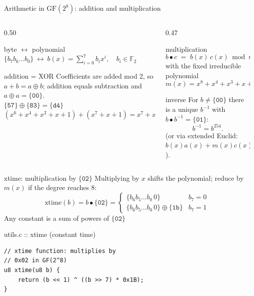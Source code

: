 \documentclass[aspectratio=169,10pt]{beamer}
\newcommand{\xor}{\oplus}
\newcommand{\gm}{\bullet}                       %
\newcommand{\GF}{\mathrm{GF}(2^8)}
\newcommand{\fn}[1]{\mathrm{#1}}
\newcommand{\hx}[1]{\ensuremath{\mathtt{\{#1\}}}}            %
\begin{document}
\begin{frame}{Arithmetic in $\GF$: addition and multiplication}
\begin{columns}[T]
\begin{column}{0.50\textwidth}
\begin{tbox}{byte $\leftrightarrow$ polynomial}
\small
$\{b_7b_6\dots b_0\}\ \leftrightarrow\ b(x)=\sum_{i=0}^{7}b_i x^i,\quad b_i\in\mathbb{F}_2$
\end{tbox}
\vskip6pt
\begin{tbox}{addition = XOR}
\small
Coefficients are added mod 2, so $a+b=a\xor b$; addition equals subtraction and $a\xor a=\hx{00}$.\\[3pt]
$\hx{57}\xor\hx{83}=\hx{d4}$\\
$(x^6{+}x^4{+}x^2{+}x{+}1)+(x^7{+}x{+}1)=x^7{+}x^6{+}x^4{+}x^2$
\end{tbox}
\end{column}
\begin{column}{0.47\textwidth}
\begin{tbox}{multiplication}
\small
\[ b\gm c \;=\; b(x)\,c(x)\bmod m(x) \]
with the fixed irreducible polynomial
\[ m(x)=x^8+x^4+x^3+x+1\ \ (\hx{11b}). \]
\end{tbox}
\vskip6pt
\begin{tbox}{inverse}
\small
For $b\neq\hx{00}$ there is a unique $b^{-1}$ with $b\gm b^{-1}=\hx{01}$:
\[ b^{-1}=b^{254}. \]
(or via extended Euclid: $b(x)a(x)+m(x)c(x)=1$).
\end{tbox}
\end{column}
\end{columns}
\end{frame}

\begin{frame}[fragile]{xtime: multiplication by $\hx{02}$}
\small
Multiplying by $x$ shifts the polynomial; reduce by $m(x)$ if the degree reaches 8:
\[ \fn{xtime}(b)=b\gm\hx{02}=
\begin{cases}\{b_6b_5\dots b_0\,0\} & b_7=0\\
\{b_6b_5\dots b_0\,0\}\xor\hx{1b} & b_7=1\end{cases}\]
Any constant is a sum of powers of $\hx{02}$\\[2pt]
\begin{tbox}{utils.c :: xtime (constant time)}
\begin{lstlisting}
// xtime function: multiplies by
// 0x02 in GF(2^8)
u8 xtime(u8 b) {
    return (b << 1) ^ ((b >> 7) * 0x1B);
}
\end{lstlisting}
\end{tbox}
\vskip4pt
\end{frame}
\end{document}
